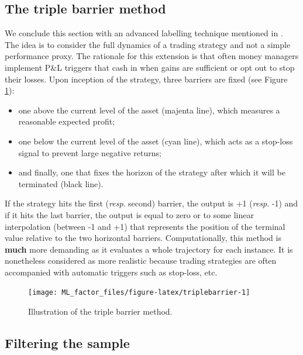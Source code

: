 \documentclass[]{krantz}
\providecommand{\tightlist}{%
  \setlength{\itemsep}{0pt}\setlength{\parskip}{0pt}}
\theoremstyle{definition}
\theoremstyle{definition}
\theoremstyle{definition}
\theoremstyle{remark}
\begin{document}
\hypertarget{the-triple-barrier-method}{%
\subsection{The triple barrier method}\label{the-triple-barrier-method}}

We conclude this section with an advanced labelling technique mentioned
in \citet{de2018advances}. The idea is to consider the full dynamics of
a trading strategy and not a simple performance proxy. The rationale for
this extension is that often money managers implement P\&L triggers that
cash in when gains are sufficient or opt out to stop their losses. Upon
inception of the strategy, three barriers are fixed (see Figure
\ref{fig:triplebarrier}):

\begin{itemize}
\tightlist
\item
  one above the current level of the asset (majenta line), which
  measures a reasonable expected profit;\\
\item
  one below the current level of the asset (cyan line), which acts as a
  stop-loss signal to prevent large negative returns;\\
\item
  and finally, one that fixes the horizon of the strategy after which it
  will be terminated (black line).
\end{itemize}

If the strategy hits the first (\emph{resp}. second) barrier, the output
is +1 (\emph{resp}. -1) and if it hits the last barrier, the output is
equal to zero or to some linear interpolation (between -1 and +1) that
represents the position of the terminal value relative to the two
horizontal barriers. Computationally, this method is \textbf{much} more
demanding as it evaluates a whole trajectory for each instance. It is
nonetheless considered as more realistic because trading strategies are
often accompanied with automatic triggers such as stop-loss, etc.

\begin{figure}[H]

{\centering \texttt{[image: ML\_factor\_files/figure-latex/triplebarrier-1]} 

}

\caption{ Illustration of the triple barrier method.}\label{fig:triplebarrier}
\end{figure}

\hypertarget{filtering-the-sample}{%
\subsection{Filtering the sample}\label{filtering-the-sample}}
\end{document}
